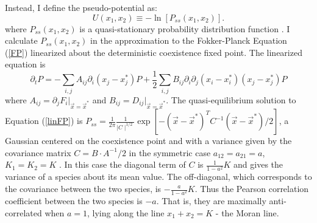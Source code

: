 Instead, I define the pseudo-potential as:
\begin{equation}
U(x_1,x_2) \equiv -\ln\left[P_{ss}(x_1,x_2)\right].
\label{quasipotential}
\end{equation}
where $P_{ss}(x_1,x_2)$ is a quasi-stationary probability distribution function \cite{Zhou2012}. 
I calculate $P_{ss}(x_1,x_2)$ in the approximation to the Fokker-Planck Equation (\ref{FP}) linearized about the deterministic coexistence fixed point. 
The linearized equation is
\begin{equation}
\partial_t P = -\sum_{i,j} A_{ij}\partial_i (x_j-x_j^*) P + \frac{1}{2} \sum_{i,j} B_{ij} \partial_i\partial_j (x_i-x_i^*) (x_j-x_j^*) P
\label{linFP}
\end{equation}
where $A_{ij}=\partial_j F_i \lvert_{\vec{x}=\vec{x}^*}$ and $B_{ij}=D_{ij} \lvert_{\vec{x}=\vec{x}^*}$.
The quasi-equilibrium solution to Equation (\ref{linFP}) is $P_{ss}=\frac{1}{2\pi}\frac{1}{\mid C\mid^{1/2}}\exp[-(\vec{x} - \vec{x}^*)^T C^{-1}(\vec{x} - \vec{x}^*)/2]$, a Gaussian centered on the coexistence point and with a variance given by the covariance matrix $C=B\cdot A^{-1}/2$ in the symmetric case $a_{12}=a_{21}=a$, $K_1=K_2=K$ \cite{VanKampen1992}. 
In this case the diagonal term of $C$ is $\frac{1}{1-a^2}K$ and gives the variance of a species about its mean value. 
The off-diagonal, which corresponds to the covariance between the two species, is $-\frac{a}{1-a^2}K$. 
Thus the Pearson correlation coefficient between the two species is $-a$. 
That is, they are maximally anti-correlated when $a=1$, lying along the line $x_1 + x_2 = K$ - the Moran line. 


